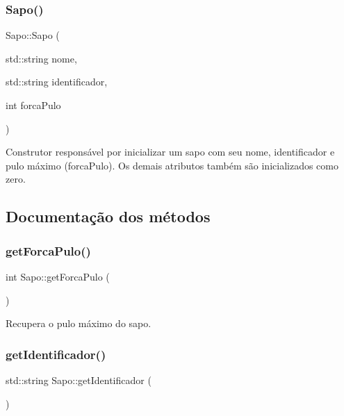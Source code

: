 \subsubsection{\texorpdfstring{Sapo()}{Sapo()}}
{\footnotesize\ttfamily Sapo\+::\+Sapo (\begin{DoxyParamCaption}\item[{std\+::string}]{nome,  }\item[{std\+::string}]{identificador,  }\item[{int}]{forca\+Pulo }\end{DoxyParamCaption})}



Construtor responsável por inicializar um sapo com seu nome, identificador e pulo máximo (forca\+Pulo). Os demais atributos também são inicializados como zero. 



\subsection{Documentação dos métodos}
\mbox{\label{classSapo_ac6225c3632a30877068c9b2bc50e6ed1}} 
\subsubsection{\texorpdfstring{get\+Forca\+Pulo()}{getForcaPulo()}}
{\footnotesize\ttfamily int Sapo\+::get\+Forca\+Pulo (\begin{DoxyParamCaption}{ }\end{DoxyParamCaption})}



Recupera o pulo máximo do sapo. 

\mbox{\label{classSapo_a1a9022f5e4a1f561454650b5c99baa3e}} 
\subsubsection{\texorpdfstring{get\+Identificador()}{getIdentificador()}}
{\footnotesize\ttfamily std\+::string Sapo\+::get\+Identificador (\begin{DoxyParamCaption}{ }\end{DoxyParamCaption})}



